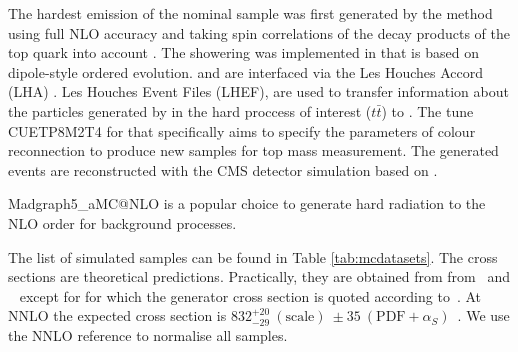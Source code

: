 The hardest emission of the nominal \ttbar sample was first generated by the \POWHEG method \cite{Frixione:2007vw} using full NLO accuracy and taking spin correlations of the decay products of the top quark into account \cite{Frixione:2007nw}. The showering was implemented in  \cite{Sjostrand:2014zea} that is based on dipole-style \pt ordered evolution. \POWHEG and  are interfaced via the Les Houches Accord (LHA) \cite{Boos:2001cv}. Les Houches Event Files (LHEF)\cite{Alwall:2006yp}, \cite{Andersen:2014efa} are used to transfer information about the particles generated by \POWHEG in the hard proccess of interest ($t\bar{t}$) to . The tune CUETP8M2T4 \cite{Kovalchuk:CR} for  that specifically aims to specify the parameters of colour reconnection to produce new samples for top mass measurement. The generated events are reconstructed with the CMS detector simulation based on \GEANTfour \cite{Agostinelli:2002hh}.

Madgraph5\_aMC@NLO\cite{Alwall:2014hca} is a popular choice to generate hard radiation to the NLO order for background processes. 

The list of simulated samples can be found in Table \ref{tab:mcdatasets}. The cross sections are theoretical predictions. Practically, they are obtained from from~\cite{twiki:SingleTopRefXsec} and ~\cite{twiki:SM13} except for \ttbar for which the generator cross section is quoted according to~\cite{site:MCM}. At NNLO the expected \ttbar cross section is $832^{ +20}_{-29}~(\text{scale})~\pm 35~(\text{PDF}+\alpha_S)$~\cite{twiki:TTbarNLO}. We use the NNLO reference to normalise all \ttbar samples.

